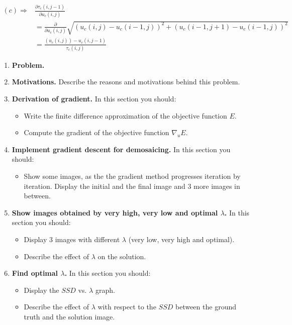 \documentclass{paper}
\begin{document}
\begin{align}
(c) \Longrightarrow
	& \frac{\partial{\tau_{c}\left(i,j-1\right)}}{\partial u_{c}\left(i,j\right)} \nonumber \\
	&= \frac{\partial}{\partial{u_{c}\left(i,j\right)}} \sqrt{ \left(u_{c}(i,j)-u_{c}(i-1,j)\right)^2 + \left(u_{c}(i-1,j+1) - u_{c}(i-1,j)\right)^2} \nonumber \\	
	&= \frac{\left(u_{c}(i,j)\right)-u_{c} \left(i,j-1\right)}{\tau_{c}\left(i,j\right)}
\end{align}



\begin{enumerate}
\item \textbf{Problem.}

\item \textbf{Motivations.} Describe the reasons and motivations behind this problem.
\item \textbf{Derivation of gradient.} In this section you should:

\begin{itemize}
\item Write the finite difference approximation of the objective function $E$.
\item Compute the gradient of the objective function $\nabla_uE$.  
\end{itemize}


\item \textbf{Implement gradient descent for demosaicing.} In this section you should:

\begin{itemize}
\item Show some images, as the the gradient method progresses iteration by iteration. Display the initial and the final image and 3 more images in between.
\end{itemize}

\item \textbf{Show images obtained by very high, very low and optimal $\lambda$.} In this section you should:

\begin{itemize}
\item Display 3 images with different $\lambda$ (very low, very high and optimal).
\item Describe the effect of $\lambda$ on the solution.
\end{itemize}

\item \textbf{ Find optimal $\lambda$.} In this section you should:

\begin{itemize}
\item Display the $SSD$ vs. $\lambda$ graph.
\item Describe the effect of $\lambda$ with respect to the $SSD$ between the ground truth and the solution image.
\end{itemize}


\end{enumerate}


 
\end{document}
